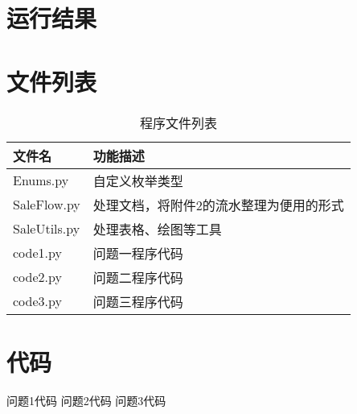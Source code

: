 \documentclass[withoutpreface,bwprint]{cumcmthesis} %
\begin{document}
\begin{appendices}

\section{运行结果}


\section{文件列表}
\begin{table}[H]
    \caption{程序文件列表}
    \centering
    \begin{tabularx}{\textwidth}{l X}
        \bottomrule
        文件名 & 功能描述 \\
        \midrule
        Enums.py & 自定义枚举类型 \\
        SaleFlow.py & 处理文档，将附件2的流水整理为便用的形式 \\
        SaleUtils.py & 处理表格、绘图等工具 \\
        code1.py & 问题一程序代码 \\
        code2.py & 问题二程序代码 \\
        code3.py & 问题三程序代码 \\
        \bottomrule
    \end{tabularx}
    \label{tab:文件列表}
\end{table}

\section{代码}
问题1代码
% 
问题2代码
% 
问题3代码
% 

\end{appendices}
\end{document}
